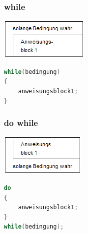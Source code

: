 \subsubsection{while}

\noindent
\begin{minipage}{0.4\columnwidth} 
\includegraphics[width=1\columnwidth]{Pictures/Struktogramm_while.png}
\end{minipage}
\begin{minipage}{0.6\columnwidth} 
\begin{lstlisting}[language = c]
while(bedingung)
{
    anweisungsblock1;
}
\end{lstlisting}
\end{minipage}

\subsubsection{do while}

\noindent
\begin{minipage}{0.4\columnwidth} 
\includegraphics[width=1\columnwidth]{Pictures/Struktogramm_doWhile.png}
\end{minipage}
\begin{minipage}{0.6\columnwidth} 
\begin{lstlisting}[language = c]
do
{
    anweisungsblock1;
}
while(bedingung);
\end{lstlisting}
\end{minipage}